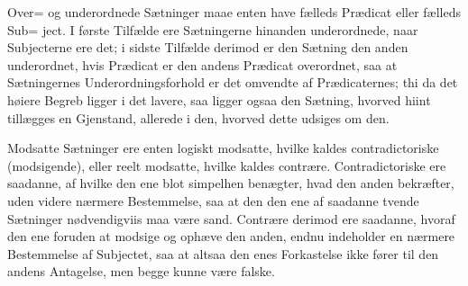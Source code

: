 \documentclass[12pt]{book}
\def\textit#1{#1}%
\def\emph#1{#1}%
\newcommand{\opage}[1]{\marginnote{\footnotesize\textit{[#1]}}}
\begin{document}
\emph{Over= og underordnede} Sætninger maae enten have fælleds Prædicat eller
fælleds Sub=%
\opage{297} ject. I første Tilfælde ere Sætningerne hinanden underordnede, naar
Subjecterne ere det; i sidste Tilfælde derimod er den Sætning den anden
underordnet, hvis Prædicat er den andens Prædicat overordnet, saa at
Sætningernes Underordningsforhold er det omvendte af Prædicaternes; thi da det
høiere Begreb ligger i det lavere, saa ligger ogsaa den Sætning, hvorved hiint
tillægges en Gjenstand, allerede i den, hvorved dette udsiges om den.

\emph{Modsatte} Sætninger ere enten logiskt modsatte, hvilke kaldes
\emph{contradictoriske} (modsigende), eller reelt modsatte, hvilke kaldes
\emph{contrære}. \emph{Contradictoriske} ere saadanne, af hvilke den ene blot
simpelhen benægter, hvad den anden bekræfter, uden videre nærmere Bestemmelse,
saa at den den ene af saadanne tvende Sætninger nødvendigviis maa være sand.
\emph{Contrære} derimod ere saadanne, hvoraf den ene foruden at modsige og
ophæve den anden, endnu indeholder en nærmere Bestemmelse af Subjectet, saa at
altsaa den enes Forkastelse ikke fører til den andens Antagelse, men begge
kunne være falske.
\end{document}
